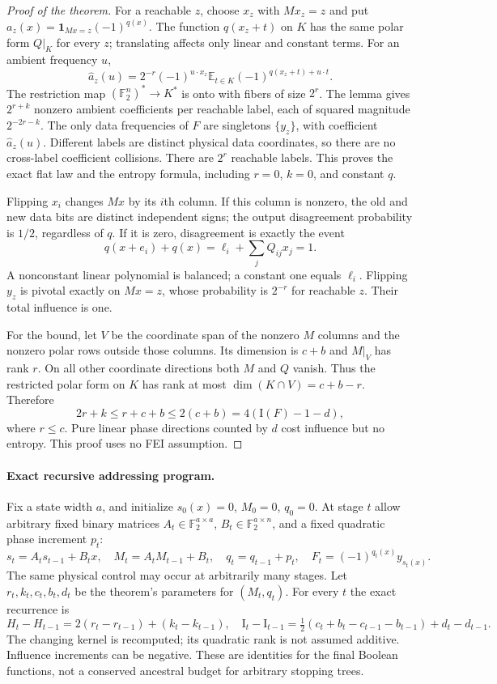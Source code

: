\documentclass[11pt]{article}
\newcommand{\F}{\mathbb F_2}
\newcommand{\I}{\mathrm I}
\begin{document}
\begin{proof}[Proof of the theorem]
For a reachable $z$, choose $x_z$ with $Mx_z=z$ and put
$a_z(x)=\mathbf1_{Mx=z}(-1)^{q(x)}$. The function $q(x_z+t)$ on $K$
has the same polar form $Q|_K$ for every $z$; translating affects only
linear and constant terms. For an ambient frequency $u$,
\[
 \widehat a_z(u)=2^{-r}(-1)^{u\cdot x_z}
 \mathbb E_{t\in K}(-1)^{q(x_z+t)+u\cdot t}.
\]
The restriction map $(\F^n)^*\to K^*$ is onto with fibers of size
$2^r$. The lemma gives $2^{r+k}$ nonzero ambient coefficients per
reachable label, each of squared magnitude $2^{-2r-k}$.
The only data frequencies of $F$ are singletons $\{y_z\}$, with
coefficient $\widehat a_z(u)$. Different labels are distinct physical
data coordinates, so there are no cross-label coefficient collisions.
There are $2^r$ reachable labels. This proves the exact flat law and
the entropy formula, including $r=0$, $k=0$, and constant $q$.

Flipping $x_i$ changes $Mx$ by its $i$th column. If this column is
nonzero, the old and new data bits are distinct independent signs;
the output disagreement probability is $1/2$, regardless of $q$.
If it is zero, disagreement is exactly the event
\[
 q(x+e_i)+q(x)=\ell_i+\sum_jQ_{ij}x_j=1.
\]
A nonconstant linear polynomial is balanced; a constant one equals
$\ell_i$. Flipping $y_z$ is pivotal exactly on $Mx=z$, whose probability
is $2^{-r}$ for reachable $z$. Their total influence is one.

For the bound, let $V$ be the coordinate span of the nonzero $M$ columns
and the nonzero polar rows outside those columns. Its dimension is
$c+b$ and $M|_V$ has rank $r$. On all other coordinate directions
both $M$ and $Q$ vanish. Thus the restricted polar form on $K$ has rank
at most $\dim(K\cap V)=c+b-r$. Therefore
\[
 2r+k\le r+c+b\le2(c+b)=4(\I(F)-1-d),
\]
where $r\le c$. Pure linear phase directions counted by $d$ cost
influence but no entropy. This proof uses no FEI assumption.
\end{proof}

\paragraph{Exact recursive addressing program.}
Fix a state width $a$, and initialize $s_0(x)=0$, $M_0=0$, $q_0=0$.
At stage $t$ allow arbitrary fixed binary matrices $A_t\in\F^{a\times a}$,
$B_t\in\F^{a\times n}$, and a fixed quadratic phase increment $p_t$:
\[
 s_t=A_ts_{t-1}+B_tx,\quad M_t=A_tM_{t-1}+B_t,\quad
 q_t=q_{t-1}+p_t,\quad F_t=(-1)^{q_t(x)}y_{s_t(x)}.
\]
The same physical control may occur at arbitrarily many stages.
Let $r_t,k_t,c_t,b_t,d_t$ be the theorem's parameters for $(M_t,q_t)$.
For every $t$ the exact recurrence is
\[
 H_t-H_{t-1}=2(r_t-r_{t-1})+(k_t-k_{t-1}),\quad
 \I_t-\I_{t-1}=\tfrac12(c_t+b_t-c_{t-1}-b_{t-1})+d_t-d_{t-1}.
\]
The changing kernel is recomputed; its quadratic rank is not assumed
additive. Influence increments can be negative. These are identities
for the final Boolean functions, not a conserved ancestral budget for
arbitrary stopping trees.
\end{document}
